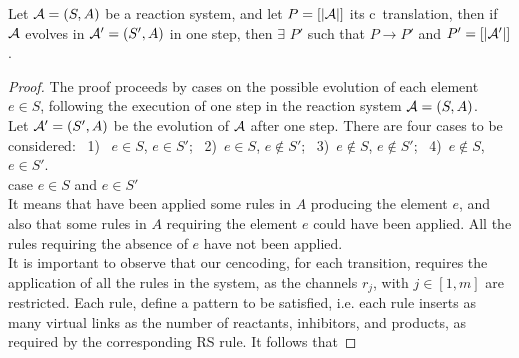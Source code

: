  
 \begin{proposition}[completeness]
 Let ${\cal A} = (S, A)$ be a reaction system, and let $P=[|{\cal A}|]$ its c\CNA~translation, then if ${\cal A}$ evolves in ${\cal A'} = (S', A)$ in one step, then $\exists$ $P'$ such that $P \rightarrow P'$ and  $P'=[|{\cal A'}|]$.
 \end{proposition}
 \begin{proof}
 The proof proceeds by cases on the possible evolution of each element  $e \in S$, following the execution of one step in the reaction system ${\cal A} = (S, A)$.\\
  Let ${\cal A'} = (S', A)$ be the evolution of  ${\cal A}$ after one step. There are four cases to be considered: \ 
 1) \ $e \in S$, $e \in S'$; \ 2)\  $e \in S$, $e \notin S'$; \ 3)\  $e \notin S$, $e \notin S'$; \ 4)\  $e \notin S$, $e \in S'$.\\
 case  $e \in S$ and $e \in S'$\\
It means that have been applied some rules  in $A$ producing the element $e$, and also that some rules in $A$ requiring the element $e$ could have been applied. All the rules requiring the absence of $e$ have not been applied.\\
It is important to observe that our c\CNA encoding, for each transition, requires the application of all the rules in the system, as the channels $r_j$, with $j \in [1,m]$ are restricted.
Each rule, define a pattern to be satisfied, i.e. each rule inserts as many virtual links  as  the number of reactants, inhibitors, and products, as required by the corresponding RS rule.
It follows that 



\end{proof}
